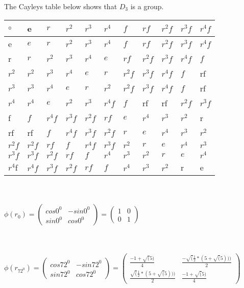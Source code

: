 \documentclass{article}
\begin{document}
The Cayleys table below shows that $D_3$ is a group.\\
\begin{tabular}{| l | l | l | l |l |l |l |l |l |l |l |}
\hline
$\circ$ & e &$ r $&$ r^2 $&$ r^3 $&$ r^4 $&$ f $&$ rf $&$ r^2f $&$ r^3f $&$ r^4f$ \\
\hline
e &$ e $&$ r $&$ r^2 $&$ r^3 $&$ r^4 $&$ f $&$ rf $&$ r^2f $&$ r^3f $&$ r^4f$ \\
\hline
r &$ r $&$ r^2 $&$ r^3 $&$ r^4 $&$ e $&$ rf $&$ r^2f $&$ r^3f $&$ r^4f $&$ f$ \\
\hline
$r^2$&$ r^2 $&$ r^3 $&$ r^4 $&$ e $&$ r $&$ r^2f $&$ r^3f $&$ r^4f $&$ f $& rf\\
\hline
$r^3$&$ r^3 $&$ r^4 $&$ e $&$ r $&$r^2$&$ r^2f $&$ r^3f $&$ r^4f $&$ f $& rf\\
\hline
$r^4$ &$ r^4 $&$ e $&$ r^2 $&$ r^3  $&$ r^4f $&$ f $& rf& rf &$ r^2f $&$ r^3f$\\
\hline
f &$ f $&$ r^4f $&$ r^3f $&$ r^2f  $&$ rf $&$ e $&$ r^4$&$ r^3 $&$ r^2 $& r\\
\hline
rf& rf &$ f $&$ r^4f $&$ r^3f $&$ r^2f $&$ r  $&$ e $&$ r^4 $&$ r^3 $&$  r^2$ \\
\hline
$r^2f$&$ r^2f $&$ rf $&$ f $&$ r^4f $&$ r^3f $&$ r^2 $&$ r  $&$ e $&$ r^4 $&$ r^3$
\\\hline
$r^3f$& $r^3f $&$r^2f $&$ rf $&$ f $&$ r^4 $&$ r^3 $&$ r^2 $&$ r  $&$ e $&$ r^4$ \\
\hline
$r^4$f& $r^4f$& $r^3f$&$r^2f $&$ rf $&$ f $&$ r^4 $&$ r^3 $&$ r^2 $&r &e\\
\hline
\end{tabular}
\\

\\
$\phi (r_0) = 
\begin{pmatrix}
cos 0^0 & -sin 0^0\\
sin 0^0 & cos0^0
\end{pmatrix} =
\begin{pmatrix}
1 & 0\\
0 & 1
\end{pmatrix} $\\\\
\vspace{4cm}

\\
$\phi (r_{72^0}) = 
\begin{pmatrix}
cos 72^0 & -sin 72^0\\
sin 72^0 & cos72^0
\end{pmatrix} =
\begin{pmatrix}
\frac{-1+\sqrt(5)}{4} & \frac{-\sqrt(\frac{1}{2}*(5+\sqrt(5)))}{2}\\
\frac{\sqrt(\frac{1}{2}*(5+\sqrt(5)))}{2}& \frac{-1+\sqrt(5)}{4}
\end{pmatrix} $\\\\
\end{document}
